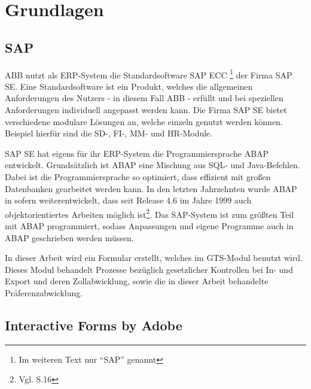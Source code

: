 
\chapter{Grundlagen}
\label{ch:Grundlagen}



\section{SAP}

ABB nutzt als \ac{ERP}-System die Standardsoftware SAP ECC \footnote{Im weiteren Text nur "`SAP"' genannt} der Firma SAP SE. Eine Standardsoftware ist ein Produkt, welches die allgemeinen Anforderungen des Nutzers - in diesem Fall ABB - erfüllt und bei speziellen Anforderungen individuell angepasst werden kann. Die Firma SAP SE bietet verschiedene modulare Lösungen an, welche einzeln genutzt werden können. Beispiel hierfür sind die \ac{SD}-, \ac{FI}-, \ac{MM}- und \ac{HR}-Module. 

SAP SE hat eigens für ihr \ac{ERP}-System die Programmiersprache \ac{ABAP} entwickelt. Grundsätzlich ist \ac{ABAP} eine Mischung aus \ac{SQL}- und Java-Befehlen. Dabei ist  die Programmiersprache so optimiert, dass effizient mit großen Datenbanken gearbeitet werden kann. In den letzten Jahrzehnten wurde \ac{ABAP} in sofern weiterentwickelt, dass  seit Release 4.6 im Jahre 1999 auch objektorientiertes Arbeiten möglich ist\footnote{Vgl. \cite{Keller.2001} S.16}. Das SAP-System  ist zum größten Teil mit \ac{ABAP} programmiert, sodass Anpassungen und eigene Programme auch in \ac{ABAP} geschrieben werden müssen. 

In dieser Arbeit wird ein Formular erstellt, welches im \ac{GTS}-Modul benutzt wird. Dieses Modul behandelt Prozesse bezüglich gesetzlicher Kontrollen bei In- und Export und deren Zollabwicklung, sowie die in dieser Arbeit behandelte Präferenzabwicklung.




\section{Interactive Forms by Adobe}

